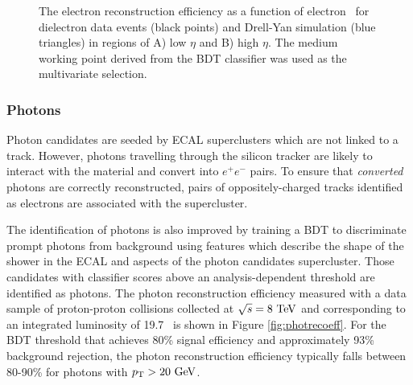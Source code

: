 \begin{figure}[htbp]
{  }
  \caption[Electron Reconstruction Efficiency]{The electron reconstruction efficiency as a function of electron \pT\ for dielectron data events (black points) and Drell-Yan simulation (blue triangles) in regions of A) low $\eta$ and B) high $\eta$. The medium working point derived from the BDT classifier was used as the multivariate selection.\cite{CMSELEPERF}}
    \label{fig:elerecoeff}
\end{figure}

\subsubsection{Photons}

Photon candidates are seeded by ECAL superclusters which are not linked to a track. However, photons travelling through the silicon tracker are likely to interact with the material and convert into $e^{+}e^{-}$ pairs. To ensure that \textit{converted} photons are correctly reconstructed, pairs of oppositely-charged tracks identified as electrons are associated with the supercluster.

The identification of photons is also improved by training a BDT to discriminate prompt photons from background using features which describe the shape of the shower in the ECAL and aspects of the photon candidates supercluster.\cite{CMSPHOTPERF} Those candidates with classifier scores above an analysis-dependent threshold are identified as photons. The photon reconstruction efficiency measured with a data sample of proton-proton collisions collected at $\sqrt{s} = 8\ \mathrm{TeV}$ and corresponding to an integrated luminosity of 19.7 \invfb\ is shown in Figure \ref{fig:photrecoeff}. For the BDT threshold that achieves 80\% signal efficiency and approximately 93\% background rejection, the photon reconstruction efficiency typically falls between 80-90\% for photons with $p_{\mathrm{T}} > 20\ \mathrm{GeV}$.

